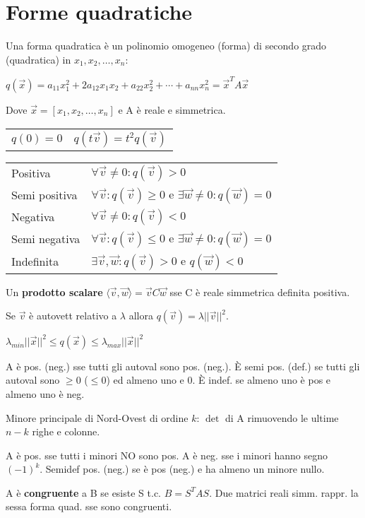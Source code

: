 \section{Forme quadratiche}

Una forma quadratica è un polinomio omogeneo (forma) di secondo grado (quadratica) in $x_1, x_2, \dots, x_n$:

$q(\vec{x}) = a_{11}x_1^2+2a_{12}x_1x_2+a_{22}x_2^2+\cdots+a_{nn}x_n^2 = \vec{x}^TA\vec{x}$

Dove $\vec{x} = [x_1, x_2, \dots, x_n]$ e A è reale e simmetrica.

\begin{tabular}{ll}
	$q(0)=0$ & $q(t\vec{v}) = t^2q(\vec{v})$
\end{tabular}

\begin{tabular}{ll}
	Positiva & $\forall \vec{v} \ne 0: q(\vec{v}) > 0$ \\
	Semi positiva & $\forall \vec{v}: q(\vec{v}) \ge 0$ e $\exists \vec{w} \ne 0 : q(\vec{w}) = 0$ \\
	Negativa & $\forall \vec{v} \ne 0: q(\vec{v}) < 0$ \\
	Semi negativa & $\forall \vec{v}: q(\vec{v}) \le 0$ e $\exists \vec{w} \ne 0 : q(\vec{w}) = 0$ \\
	Indefinita & $\exists \vec{v}, \vec{w}: q(\vec{v}) > 0$ e $q(\vec{w}) < 0$
\end{tabular}

Un \textbf{prodotto scalare} $\langle\vec{v}, \vec{w}\rangle = \vec{v}C\vec{w}$ sse C è reale simmetrica definita positiva.

Se $\vec{v}$ è autovett relativo a $\lambda$ allora $q(\vec{v}) = \lambda||\vec{v}||^2$.

$\lambda_{min}||\vec{x}||^2 \le q(\vec{x}) \le \lambda_{max}||\vec{x}||^2$

A è pos. (neg.) sse tutti gli autoval sono pos. (neg.). È semi pos. (def.) se tutti gli autoval sono $\ge 0$ ($\le 0$) ed almeno uno e 0. È indef. se almeno uno è pos e almeno uno è neg.

Minore principale di Nord-Ovest di ordine $k$: $\det$ di A rimuovendo le ultime $n-k$ righe e colonne.

A è pos. sse tutti i minori NO sono pos. A è neg. sse i minori hanno segno $(-1)^k$. Semidef pos. (neg.) se è pos (neg.) e ha almeno un minore nullo.

A è \textbf{congruente} a B se esiste S t.c. $B=S^TAS$. Due matrici reali simm. rappr. la sessa forma quad. sse sono congruenti.

